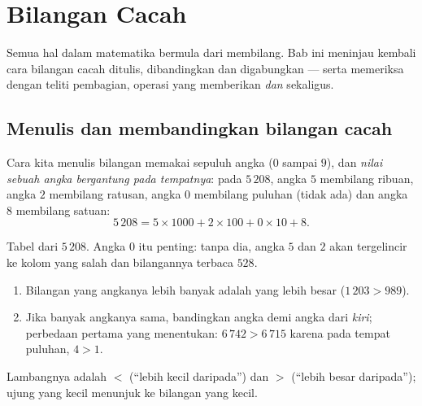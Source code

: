 \chapter{Bilangan Cacah}\label{ch:g6:wholes}

Semua hal dalam matematika bermula dari membilang. Bab ini meninjau
kembali cara bilangan cacah ditulis, dibandingkan dan digabungkan ---
serta memeriksa dengan teliti pembagian, operasi yang memberikan  \emph{dan}  sekaligus.

\section{Menulis dan membandingkan bilangan cacah}

\begin{definition}\label{def:g6:wholes:place}
Cara kita menulis bilangan memakai sepuluh angka ($0$ sampai $9$), dan
\emph{nilai sebuah angka bergantung pada tempatnya}:
pada $5\,208$, angka $5$ membilang ribuan, angka $2$ membilang ratusan,
angka $0$ membilang puluhan (tidak ada) dan angka $8$ membilang satuan:
\[
5\,208 = 5 \times 1000 + 2 \times 100 + 0 \times 10 + 8 .
\]
\end{definition}

\begin{omfigure}

{\small Tabel  dari $5\,208$. Angka $0$ itu penting: tanpa
dia, angka $5$ dan $2$ akan tergelincir ke kolom yang salah dan
bilangannya terbaca $528$.}
\end{omfigure}

\begin{method}\label{met:g6:wholes:compare}
\begin{enumerate}
  \item Bilangan yang angkanya lebih banyak adalah yang lebih besar
        ($1\,203 > 989$).
  \item Jika banyak angkanya sama, bandingkan angka demi angka dari
        \emph{kiri}; perbedaan pertama yang menentukan:
        $6\,742 > 6\,715$ karena pada tempat puluhan, $4 > 1$.
\end{enumerate}
Lambangnya adalah $<$ (``lebih kecil daripada'') dan $>$ (``lebih
besar daripada''); ujung yang kecil menunjuk ke bilangan yang kecil.
\end{method}

